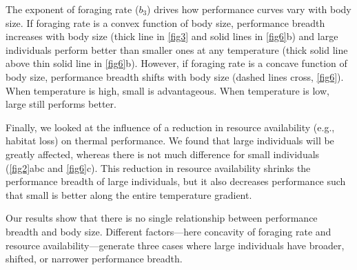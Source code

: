 The exponent of foraging rate ($b_3$) drives how performance curves vary with body size.
If foraging rate is a convex function of body size, performance breadth increases with body size (thick line in \cref{fig3} and solid lines in \cref{fig6}b) and large individuals perform better than smaller ones at any temperature (thick solid line above thin solid line in \cref{fig6}b).
However, if foraging rate is a concave function of body size, performance breadth shifts with body size (dashed lines cross, \cref{fig6}).
When temperature is high, small is advantageous.
When temperature is low, large still performs better. %
   
Finally, we looked at the influence of a reduction in resource availability (e.g., habitat loss) on thermal performance.
We found that large individuals will be greatly affected, whereas there is not much difference for small individuals (\cref{fig2}abc and \cref{fig6}c). %
This reduction in resource availability shrinks the performance breadth of large individuals, but it also decreases performance such that small is better along the entire temperature gradient.

Our results show that there is no single relationship between performance breadth and body size. 
Different factors---here concavity of foraging  rate and resource availability---generate three cases where large individuals have broader, shifted, or narrower performance breadth.
